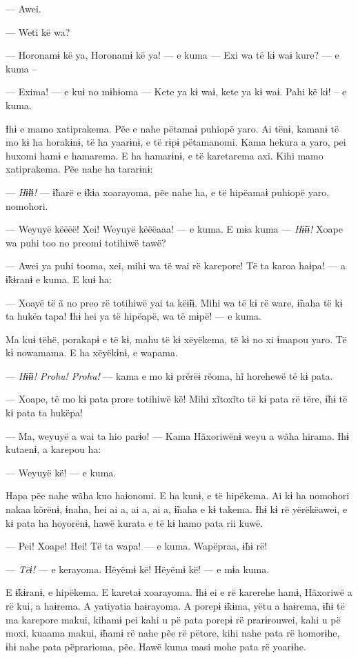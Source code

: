 --- Awei. 

--- Weti kë wa?

--- Horonamɨ kë ya, Horonamɨ kë ya! --- e kuma --- Exi wa të kɨ waɨ kure?
--- e kuma -- 

--- Exima! --- e kuɨ no mɨhɨoma --- Kete ya kɨ waɨ, kete ya kɨ waɨ. Pahi kë
kɨ! -- e kuma. 

Ɨhɨ e mamo xatiprakema. Pẽe e nahe pëtamaɨ puhiopë yaro. Ai tënɨ, kamanɨ
të mo kɨ ha horakɨnɨ, të ha yaarɨnɨ, e të rɨpɨ pëtamanomi. Kama hekura a
yaro, pei huxomi hamɨ e hamarema. E ha hamarɨnɨ, e të karetarema axi.
Kihi mamo xatiprakema. Pẽe nahe ha tararɨnɨ: 

--- \textit{Hɨ̃ɨɨ! }--- ɨ̃harë e ɨ̃kɨa xoarayoma, pẽe nahe ha, e të hipëamaɨ puhiopë
yaro, nomohori. 

--- Weyuyë këëëë! Xei! Weyuyë këëëaaa! --- e kuma. E mɨa kuma --- \textit{Hɨ̃ɨɨ!
}Xoape wa puhi too no preomi totihiwë tawë?

--- Awei ya puhi tooma, xei, mihi wa të wai rë karepore! Të ta karoa haɨpa!
--- a ɨ̃kɨranɨ e kuma. E kuɨ ha: 

--- Xoayë të ã no preo rë totihiwë yai ta këɨ̃ɨɨ. Mihi wa të kɨ rë ware,
ɨ̃naha të kɨ ta hukëa tapa! Ɨhɨ hei ya të hipëapë, wa të mɨpë! --- e
kuma. 

Ma kuɨ tëhë, porakapɨ e të kɨ, mahu të kɨ xëyëkema, të kɨ no xi ɨmapou
yaro. Të kɨ nowamama. E ha xëyëkɨnɨ, e wapama. 

--- \textit{Hɨ̃ɨɨ!  Prohu! Prohu!} --- kama e mo kɨ prërëɨ rëoma, hĩ horehewë të kɨ
pata. 

--- Xoape, të mo kɨ pata prore totihiwë kë! Mihi xĩtoxĩto të kɨ pata rë
tëre, ɨ̃hɨ të kɨ pata ta hukëpa!

--- Ma, weyuyë a wai ta hio parɨo! --- Kama Hãxoriwënɨ weyu a wãha hirama.
Ɨhɨ kutaenɨ, a karepou ha:

--- Weyuyë kë! --- e kuma. 

Hapa pẽe nahe wãha kuo haɨonomi. E ha kunɨ, e të hipëkema. Ai kɨ ha
nomohori nakaa kõrënɨ, ɨnaha, hei ai a, ai a, ai a, ɨ̃naha e kɨ takema.
Ɨhɨ kɨ rë yërëkëawei, e kɨ pata ha hoyorënɨ, hawë kurata e të kɨ hamo
pata rii kuwë. 

--- Pei! Xoape! Hei! Të ta wapa! --- e kuma. Wapëpraa, ɨ̃hɨ rë! 

--- \textit{Tëɨ!} --- e kerayoma. Hëyëmɨ kë! Hëyëmɨ kë! --- e mɨa kuma. 

E ɨ̃kɨranɨ, e hipëkema. E karetaɨ xoarayoma. Ɨhɨ ei e rë karerehe hamɨ,
Hãxoriwë a rë kui, a haɨrema. A yatiyatia haɨrayoma. A porepɨ ɨ̃kɨma,
yëtu a haɨrema, ɨ̃hɨ të ma karepore makui, kihamɨ pei kahi u pë pata
porepɨ rë prarɨrouwei, kahi u pë moxi, kuaama makui, ɨ̃hamɨ rë nahe pẽe
rë pëtore, kihi nahe pata rë homorɨhe, ɨhɨ nahe pata pëprarioma, pẽe.
Hawë kuma masi mohe pata rë yoarɨhe. 


